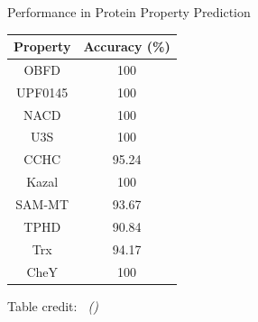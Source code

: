 \documentclass[dvipsnames,
hyperref={colorlinks,citecolor=black}
]{beamer}
\newcommand{\credit}[2]{\par\hfill \tiny #1 credit:~\itshape\citeauthor{#2} (\citeyear{#2})}
\begin{document}
\begin{frame}{Performance in Protein Property Prediction}
	\begin{center}
		\begin{tabular}{cc}\hline
			Property & Accuracy (\%) \\\hline
			OBFD     & 100 \\
			UPF0145  & 100 \\
			NACD     & 100 \\
			U3S      & 100 \\
			CCHC     & 95.24  \\
			Kazal    & 100 \\
			SAM-MT   & 93.67  \\
			TPHD     & 90.84  \\
			Trx      & 94.17  \\
			CheY     & 100 \\\hline
		\end{tabular}
	\end{center}
	\credit{Table}{lv2024prollama}
\end{frame}
\end{document}
